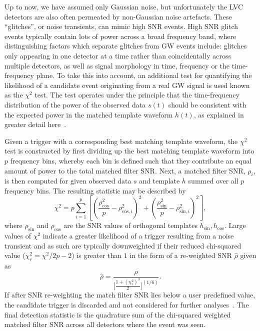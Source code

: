 %
%
Up to now, we have assumed only Gaussian noise, but unfortunately the 
\ac{LVC} detectors are also often permeated by  
non-Gaussian noise artefacts. These ``glitches'', or noise 
transients, can mimic high 
\ac{SNR} events. High \ac{SNR} glitch events typically contain lots of power 
across a broad frequency band, where distinguishing factors which 
separate glitches from \ac{GW} events include: glitches only appearing 
in one detector at a time rather than coincidentally across multiple 
detectors, as well as signal morphology in time, 
frequency or the 
time-frequency plane. To take this into account, an additional test 
for quantifying the likelihood 
of a candidate event 
originating from a real \ac{GW} signal is used known as 
the $\chi^{2}$ test. The test operates under the principle 
that the time-frequency distribution of the power of the 
observed data $s(t)$ should be consistent with 
the expected power in the matched template waveform $h(t)$, as explained in greater detail here~\cite{PhysRevD.71.062001,0264-9381-33-21-215004}.

%
%
Given a trigger with a corresponding best 
matching template waveform, the $\chi^2$ test is constructed by first dividing 
up the best matching template waveform into 
$p$ frequency bins, whereby each bin 
is defined such that they contribute an equal amount of power 
to the total matched filter \ac{SNR}. Next, a matched filter \ac{SNR},
$\rho_i$, is then computed for given observed data $s$ and template $h$ 
summed over all $p$ frequency bins. The resulting 
statistic may be described by 
%
\begin{equation} \label{eq:gw_chisquared}
    \chi^2 = p \sum_{i=1}^p \left[  \left( \frac{\rho_{\mathrm{cos}}^2 }{p} - \rho_{\mathrm{cos}, i}^2 \right)^2 
    + \left( \frac{\rho_{\mathrm{sin}}^2 }{p} - \rho_{\mathrm{sin}, i}^2 \right)^2 \right],
\end{equation}
%
where $\rho_{\mathrm{sin}}$ and $\rho_{\mathrm{cos}}$ are the 
\ac{SNR} values of orthogonal templates $h_{\mathrm{sin}},h_{\mathrm{cos}}$. Large values of 
$\chi^2$ indicate a greater likelihood 
of a trigger resulting from a noise transient and as such are typically 
downweighted if their reduced chi-squared value ($\chi^{2}_r = \chi^2/2p - 2$) 
is greater than $1$ in the form of a re-weighted \ac{SNR} $\hat{\rho}$ 
given as 
%
\begin{equation}
    \hat{\rho} = \frac{\rho}{\lbrack\frac{1+(\chi_{r}^2)^3}{2}\rbrack^{(1/6)}}.
\end{equation}
%
If after \ac{SNR} re-weighting the match filter \ac{SNR} lies below a user predefined 
value, the candidate trigger is discarded and not considered for further 
analyses~\cite{0264-9381-33-21-215004}. The final detection statistic is 
the quadrature sum of the chi-squared weighted matched filter \ac{SNR} across 
all detectors where the event was seen.


